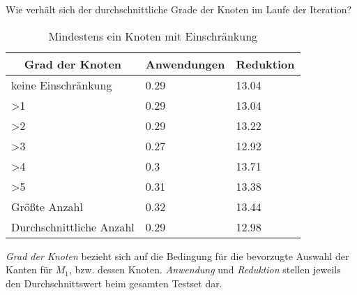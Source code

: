Wie verhält sich der durchschnittliche Grade der Knoten im Laufe der Iteration?

\begin{table}[htb]
\caption{Mindestens ein Knoten mit Einschränkung\label{tab:degreeOR}}
\vspace*{1em}
\centering

\bgroup
\def\arraystretch{1.3}%

\begin{threeparttable}

\begin{tabular}[c]{l|l|l}
	
	\multicolumn{1}{c|}{\textbf{Grad der Knoten}} & 
	\multicolumn{1}{c|}{\textbf{Anwendungen}} & 
	\multicolumn{1}{c}{\textbf{Reduktion}} \\ 
	
	\hline

	keine Einschränkung&0.29&13.04\\
	>1&0.29 &13.04 \\
	>2&0.29 &13.22 \\
	>3& 0.27& 12.92 \\
	>4& 0.3& 13.71 \\
	>5& 0.31&13.38 \\
	Größte Anzahl& 0.32&13.44 \\
	Durchschnittliche Anzahl& 0.29&12.98 \\
	
\end{tabular}
\begin{tablenotes}\footnotesize
\item \emph{Grad der Knoten} bezieht sich auf die Bedingung für die bevorzugte Auswahl der Kanten für $M_{1}$, bzw. dessen Knoten. \emph{Anwendung} und \emph{Reduktion} stellen jeweils den Durchschnittswert beim gesamten Testset dar.
\end{tablenotes}

\end{threeparttable}

\egroup

\end{table}

